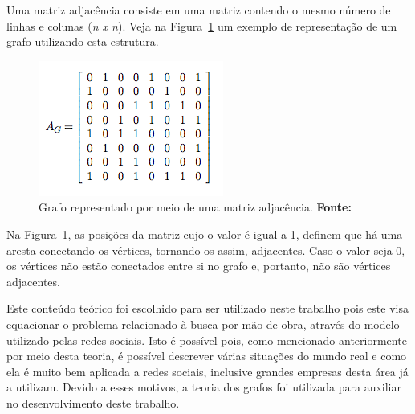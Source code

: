 Uma matriz adjacência consiste em uma matriz contendo o mesmo número de linhas e colunas (\textit{n x n}). Veja na Figura~\ref{fig:ilustracao_matriz_adjacencia} um exemplo de representação de um grafo utilizando esta estrutura.

\begin{figure}[h!]
	\centerline{\includegraphics[scale=0.7]{./imagens/matriz_adjacencia.png}}
	\caption[Grafo representado por meio de uma matriz adjacência]
	{Grafo representado por meio de uma matriz adjacência. \textbf{Fonte:} }
	\label{fig:ilustracao_matriz_adjacencia}
\end{figure}

Na Figura~\ref{fig:ilustracao_matriz_adjacencia}, as posições da matriz cujo o valor é igual a 1, definem que há uma aresta conectando os vértices, tornando-os assim, adjacentes. Caso o valor seja 0, os vértices não estão conectados entre si no grafo e, portanto, não são vértices adjacentes.

\par Este conteúdo teórico foi escolhido para ser utilizado neste trabalho pois este visa equacionar o problema relacionado à busca por mão de obra, através do modelo utilizado pelas redes sociais. Isto é possível pois, como mencionado anteriormente por meio desta teoria, é possível descrever várias situações do mundo real e como ela é muito bem aplicada a redes sociais, inclusive grandes empresas desta área já a utilizam. Devido a esses motivos, a teoria dos grafos foi utilizada para auxiliar no desenvolvimento deste trabalho.
